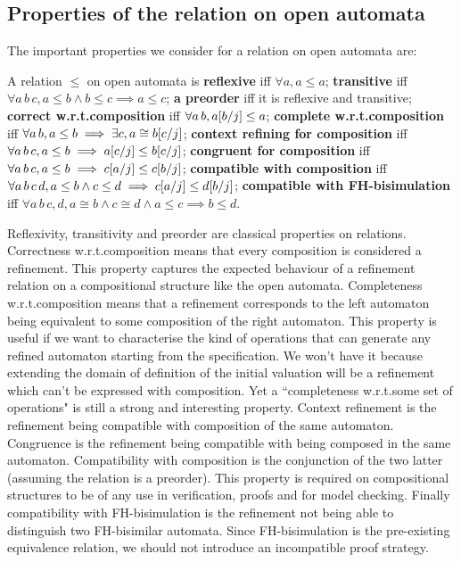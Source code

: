 \documentclass{article}
\begin{document}
\subsection{Properties of the relation on open automata}
The important properties we consider for a relation on open automata are:
\begin{defi} A relation \(\leq\) on open automata is
 \textbf{reflexive} iff \(\forall a, a \leq a\);
 \textbf{transitive} iff \(\forall a\, b\, c, a \leq b \wedge b \leq c \implies a \leq c\);
 \textbf{a preorder} iff it is reflexive and transitive;
 \textbf{correct w.r.t.\@ composition} iff \(\forall a\, b, a{\left[b\middle/j\right]} \leq a\);
 \textbf{complete w.r.t.\@ composition} iff \(\forall a\, b, a \leq b \implies \exists c, a \cong b{\left[c\middle/j\right]}\);
 \textbf{context refining for composition} iff \(\forall a\, b\, c, a \leq b \implies a{\left[c\middle/j\right]} \leq b{\left[c\middle/j\right]}\);
 \textbf{congruent for composition} iff \(\forall a\, b\, c, a \leq b \implies c{\left[a\middle/j\right]} \leq c{\left[b\middle/j\right]}\);
 \textbf{compatible with composition} iff \(\forall a\, b\, c\, d, a \leq b \wedge c \leq d \implies c{\left[a\middle/j\right]} \leq d{\left[b\middle/j\right]}\);
 \textbf{compatible with FH-bisimulation} iff \(\forall a\, b\, c, d, a \cong b \wedge c \cong d \wedge a \leq c \implies b \leq d\).
\end{defi}
Reflexivity, transitivity and preorder are classical properties on relations.
Correctness w.r.t.\@ composition means that every composition is considered a refinement.
This property captures the expected behaviour of a refinement relation on a compositional structure like the open automata.
Completeness w.r.t.\@ composition means that a refinement corresponds to the left automaton being equivalent to some composition of the right automaton.
This property is useful if we want to characterise the kind of operations that can generate any refined automaton starting from the specification.
We won't have it because extending the domain of definition of the initial valuation will be a refinement which can't be expressed with composition.
Yet a ``completeness w.r.t.\@ some set of operations" is still a strong and interesting property.
Context refinement is the refinement being compatible with composition of the same automaton.
Congruence is the refinement being compatible with being composed in the same automaton.
Compatibility with composition is the conjunction of the two latter (assuming the relation is a preorder).
This property is required on compositional structures to be of any use in verification, proofs and for model checking.
Finally compatibility with FH-bisimulation is the refinement not being able to distinguish two FH-bisimilar automata.
Since FH-bisimulation is the pre-existing equivalence relation, we should not introduce an incompatible proof strategy.
\end{document}
